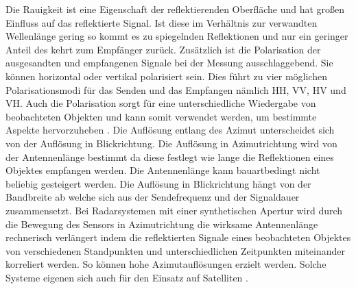 Die Rauigkeit ist eine Eigenschaft der reflektierenden Oberfläche und hat großen Einfluss auf das reflektierte Signal. Ist diese im Verhältnis
zur verwandten Wellenlänge gering so kommt es zu spiegelnden Reflektionen und nur ein geringer Anteil des kehrt zum Empfänger zurück. 
Zusätzlich ist die Polarisation der ausgesandten und empfangenen Signale bei der Messung ausschlaggebend. Sie können horizontal oder 
vertikal polarisiert sein. Dies führt zu vier möglichen Polarisationsmodi für das Senden und das Empfangen nämlich HH, VV, HV und VH. Auch die 
Polarisation sorgt für eine unterschiedliche Wiedergabe von beobachteten Objekten und kann somit verwendet werden, um bestimmte Aspekte hervorzuheben
 \cite{einfuehrung_in_fernerkundung}. 
Die Auflösung entlang des Azimut unterscheidet sich von der Auflösung in Blickrichtung. 
Die Auflösung in Azimutrichtung wird von der Antennenlänge bestimmt da diese festlegt wie lange die Reflektionen eines Objektes empfangen werden. 
Die Antennenlänge kann bauartbedingt nicht beliebig gesteigert werden.
Die Auflösung in Blickrichtung hängt von der Bandbreite ab welche sich aus der Sendefrequenz und der Signaldauer zusammensetzt. 
Bei Radarsystemen mit einer synthetischen Apertur wird durch die Bewegung des Sensors in Azimutrichtung die 
wirksame Antennenlänge rechnerisch verlängert indem die reflektierten Signale eines beobachteten Objektes von verschiedenen Standpunkten und unterschiedlichen Zeitpunkten 
miteinander korreliert werden. So können hohe Azimutauflösungen erzielt werden. Solche Systeme eigenen sich auch für den Einsatz auf Satelliten \cite{einfuehrung_in_fernerkundung}. 

